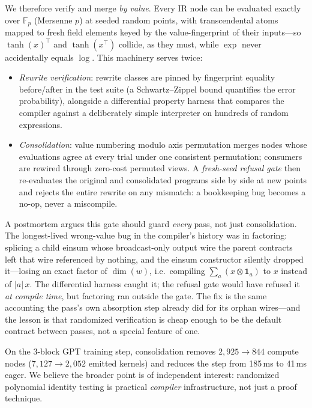 \documentclass[sigplan,10pt,review]{acmart}
\begin{document}
We therefore verify and merge \emph{by value}. Every IR node can be
evaluated exactly over $\mathbb{F}_p$ (Mersenne $p$) at seeded random
points, with transcendental atoms mapped to fresh field elements keyed by
the value-fingerprint of their inputs---so $\tanh(x)^{\top}$ and
$\tanh(x^{\top})$ collide, as they must, while $\exp$ never accidentally
equals $\log$. This machinery serves twice:

\begin{itemize}
\item \emph{Rewrite verification}: rewrite classes are pinned by
  fingerprint equality before/after in the test suite (a
  Schwartz--Zippel bound \cite{schwartz1980,zippel1979} quantifies the
  error probability), alongside a differential property harness that
  compares the compiler against a deliberately simple interpreter on
  hundreds of random expressions.
\item \emph{Consolidation}: value numbering \cite{gulwani2004gvn} modulo axis permutation
  merges nodes whose evaluations agree at every trial under one
  consistent permutation; consumers are rewired through zero-cost
  permuted views. A \emph{fresh-seed refusal gate} then re-evaluates the
  original and consolidated programs side by side at new points and
  rejects the entire rewrite on any mismatch: a bookkeeping bug becomes a
  no-op, never a miscompile.
\end{itemize}

A postmortem argues this gate should guard \emph{every} pass, not just
consolidation. The longest-lived wrong-value bug in the compiler's
history was in factoring: splicing a child einsum whose broadcast-only
output wire the parent contracts left that wire referenced by nothing,
and the einsum constructor silently dropped it---losing an exact factor
of $\dim(w)$, i.e.\ compiling $\sum_a (x \otimes \mathbf{1}_a)$ to
$x$ instead of $|a|\,x$. The differential harness caught it; the
refusal gate would have refused it \emph{at compile time}, but
factoring ran outside the gate. The fix is the same accounting the
pass's own absorption step already did for its orphan wires---and the
lesson is that randomized verification is cheap enough to be the
default contract between passes, not a special feature of one.

On the 3-block GPT training step, consolidation removes
$2{,}925 \rightarrow 844$ compute nodes ($7{,}127 \rightarrow 2{,}052$
emitted kernels) and reduces the step from 185\,ms to 41\,ms eager. We
believe the broader point is of independent interest: randomized
polynomial identity testing is practical \emph{compiler} infrastructure,
not just a proof technique.
\end{document}

